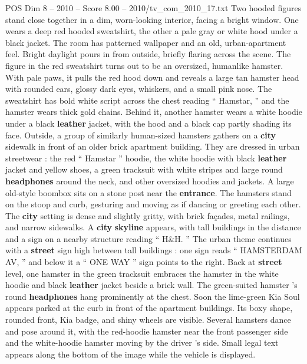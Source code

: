 \begin{textsample}{POS Dim 8 – 2010 – Score 8.00 – 2010/tv\_com\_2010\_17.txt}  \label{ex:f8_pos_021}
Two hooded figures stand close together in a dim, worn-looking interior, facing a bright window.
One wears a deep red hooded sweatshirt, the other a pale gray or white hood under a black jacket.
The room has patterned wallpaper and an old, urban-apartment feel.
Bright daylight pours in from outside, briefly flaring across the scene.
The figure in the red sweatshirt turns out to be an oversized, humanlike hamster.
With pale paws, it pulls the red hood down and reveals a large tan hamster head with rounded ears, glossy dark eyes, whiskers, and a small pink nose.
The sweatshirt has bold white script across the chest reading “ Hamstar, ” and the hamster wears thick gold chains.
Behind it, another hamster wears a white hoodie under a black \textbf{leather} jacket, with the hood and a black cap partly shading its face.
Outside, a group of similarly human-sized hamsters gathers on a \textbf{city} sidewalk in front of an older brick apartment building.
They are dressed in urban streetwear : the red “ Hamstar ” hoodie, the white hoodie with black \textbf{leather} jacket and yellow shoes, a green tracksuit with white stripes and large round \textbf{headphones} around the neck, and other oversized hoodies and jackets.
A large old-style boombox sits on a stone post near the \textbf{entrance}.
The hamsters stand on the stoop and curb, gesturing and moving as if dancing or greeting each other.
The \textbf{city} setting is dense and slightly gritty, with brick façades, metal railings, and narrow sidewalks.
A \textbf{city} \textbf{skyline} appears, with tall buildings in the distance and a sign on a nearby structure reading “ H\&H. ” The urban theme continues with a \textbf{street} sign high between tall buildings : one sign reads “ HAMSTERDAM AV, ” and below it a “ ONE WAY ” sign points to the right.
Back at \textbf{street} level, one hamster in the green tracksuit embraces the hamster in the white hoodie and black \textbf{leather} jacket beside a brick wall.
The green-suited hamster ’s round \textbf{headphones} hang prominently at the chest.
Soon the lime-green Kia Soul appears parked at the curb in front of the apartment buildings.
Its boxy shape, rounded front, Kia badge, and shiny wheels are visible.
Several hamsters dance and pose around it, with the red-hoodie hamster near the front passenger side and the white-hoodie hamster moving by the driver ’s side.
Small legal text appears along the bottom of the image while the vehicle is displayed.

\end{textsample}
